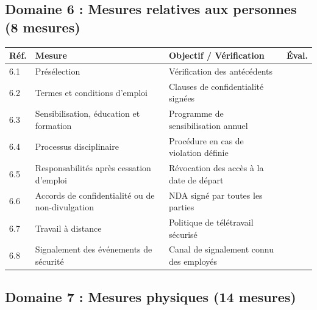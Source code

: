 \documentclass[12pt,a4paper,oneside]{report}
\begin{document}
\subsection*{Domaine 6 : Mesures relatives aux personnes (8 mesures)}

\begin{longtable}{|p{1.5cm}|p{6.5cm}|p{4.5cm}|p{1cm}|}
\hline
\rowcolor{theadcolor}
\color{white}\textbf{Réf.} &
\color{white}\textbf{Mesure} &
\color{white}\textbf{Objectif / Vérification} &
\color{white}\textbf{Éval.} \\
\hline\endhead\hline\endfoot
\rowcolor{trow1}
6.1 & Présélection &
  Vérification des antécédents & \\
\hline\rowcolor{trow2}
6.2 & Termes et conditions d'emploi &
  Clauses de confidentialité signées & \\
\hline\rowcolor{trow1}
6.3 & Sensibilisation, éducation et formation &
  Programme de sensibilisation annuel & \\
\hline\rowcolor{trow2}
6.4 & Processus disciplinaire &
  Procédure en cas de violation définie & \\
\hline\rowcolor{trow1}
6.5 & Responsabilités après cessation d'emploi &
  Révocation des accès à la date de départ & \\
\hline\rowcolor{trow2}
6.6 & Accords de confidentialité ou de non-divulgation &
  NDA signé par toutes les parties & \\
\hline\rowcolor{trow1}
6.7 & Travail à distance &
  Politique de télétravail sécurisé & \\
\hline\rowcolor{trow2}
6.8 & Signalement des événements de sécurité &
  Canal de signalement connu des employés & \\
\hline
\end{longtable}

\subsection*{Domaine 7 : Mesures physiques (14 mesures)}
\end{document}
